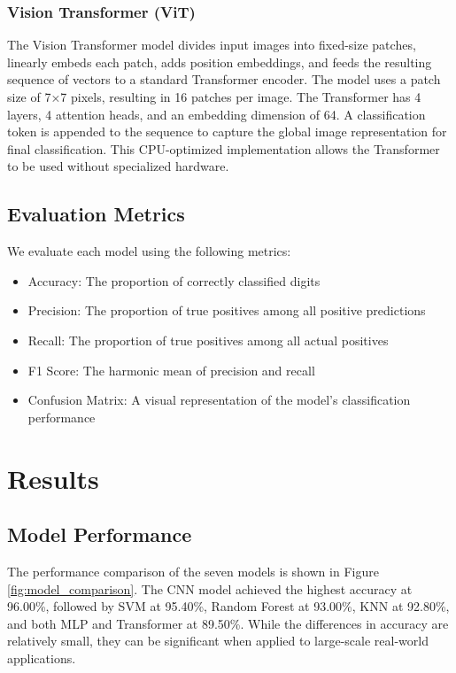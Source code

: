 \documentclass{article}
\begin{document}
\subsubsection{Vision Transformer (ViT)}
The Vision Transformer model divides input images into fixed-size patches, linearly embeds each patch, adds position embeddings, and feeds the resulting sequence of vectors to a standard Transformer encoder. The model uses a patch size of 7×7 pixels, resulting in 16 patches per image. The Transformer has 4 layers, 4 attention heads, and an embedding dimension of 64. A classification token is appended to the sequence to capture the global image representation for final classification. This CPU-optimized implementation allows the Transformer to be used without specialized hardware.

\subsection{Evaluation Metrics}
We evaluate each model using the following metrics:
\begin{itemize}
    \item Accuracy: The proportion of correctly classified digits
    \item Precision: The proportion of true positives among all positive predictions
    \item Recall: The proportion of true positives among all actual positives
    \item F1 Score: The harmonic mean of precision and recall
    \item Confusion Matrix: A visual representation of the model's classification performance
\end{itemize}

\section{Results}
\subsection{Model Performance}
The performance comparison of the seven models is shown in Figure \ref{fig:model_comparison}. The CNN model achieved the highest accuracy at 96.00\%, followed by SVM at 95.40\%, Random Forest at 93.00\%, KNN at 92.80\%, and both MLP and Transformer at 89.50\%. While the differences in accuracy are relatively small, they can be significant when applied to large-scale real-world applications.
\end{document}
